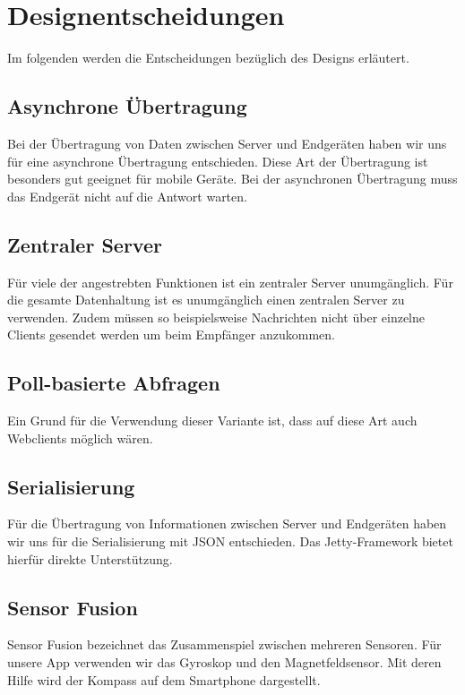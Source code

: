 \chapter{Designentscheidungen}
Im folgenden werden die Entscheidungen bezüglich des Designs erläutert.

\WIP

\section{Asynchrone Übertragung}
Bei der Übertragung von Daten zwischen Server und Endgeräten haben wir uns für eine asynchrone Übertragung entschieden. Diese Art der Übertragung ist besonders gut geeignet für mobile Geräte. Bei der asynchronen Übertragung muss das Endgerät nicht auf die Antwort warten.

\section{Zentraler Server}
Für viele der angestrebten Funktionen ist ein zentraler Server unumgänglich. Für die gesamte Datenhaltung ist es unumgänglich einen zentralen Server zu verwenden. Zudem müssen so beispielsweise Nachrichten nicht über einzelne Clients gesendet werden um beim Empfänger anzukommen. 

\section{Poll-basierte Abfragen}
Ein Grund für die Verwendung dieser Variante ist, dass auf diese Art auch Webclients möglich wären. 

\section{Serialisierung}
Für die Übertragung von Informationen zwischen Server und Endgeräten haben wir uns für die Serialisierung mit JSON entschieden. Das Jetty-Framework bietet hierfür direkte Unterstützung.


\section{Sensor Fusion}
Sensor Fusion bezeichnet das Zusammenspiel zwischen mehreren Sensoren. Für unsere App verwenden wir das Gyroskop und den Magnetfeldsensor. Mit deren Hilfe wird der Kompass auf dem Smartphone dargestellt. 

